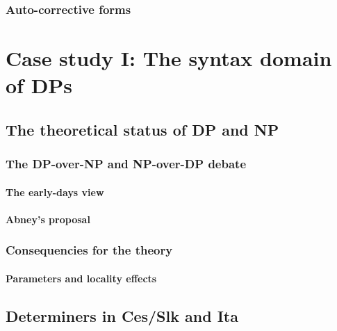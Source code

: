 \documentclass[
  a4paper,
  twoside,
  12pt,
  chapterprefix=false,
  bibliography=totocnumbered,
  listof=flat]{scrbook}
\begin{document}
\hypertarget{auto-corrective-forms}{%
\subsection{Auto-corrective forms}\label{auto-corrective-forms}}

\hypertarget{case-study-i-the-syntax-domain-of-dps}{%
\chapter{Case study I: The syntax domain of DPs}\label{case-study-i-the-syntax-domain-of-dps}}

\hypertarget{the-theoretical-status-of-dp-and-np}{%
\section{The theoretical status of DP and NP}\label{the-theoretical-status-of-dp-and-np}}

\hypertarget{the-dp-over-np-and-np-over-dp-debate}{%
\subsection{The DP-over-NP and NP-over-DP debate}\label{the-dp-over-np-and-np-over-dp-debate}}

\hypertarget{the-early-days-view}{%
\subsubsection{The early-days view}\label{the-early-days-view}}

\hypertarget{abneys-proposal}{%
\subsubsection{Abney's proposal}\label{abneys-proposal}}

\hypertarget{consequencies-for-the-theory}{%
\subsection{Consequencies for the theory}\label{consequencies-for-the-theory}}

\hypertarget{parameters-and-locality-effects}{%
\subsubsection{Parameters and locality effects}\label{parameters-and-locality-effects}}

\hypertarget{determiners-in-cesslk-and-ita}{%
\section{Determiners in Ces/Slk and Ita}\label{determiners-in-cesslk-and-ita}}
\end{document}
